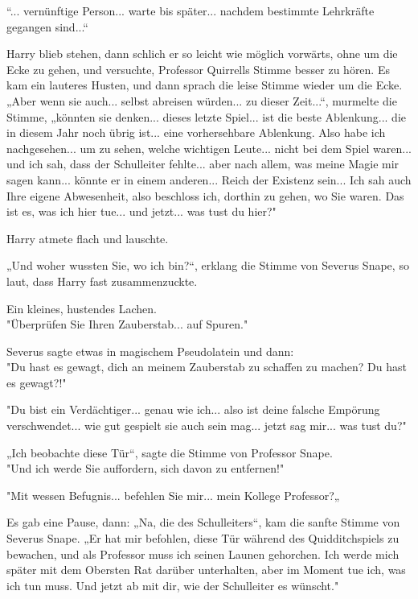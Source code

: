 {“... vernünftige Person... warte bis später... nachdem bestimmte Lehrkräfte gegangen sind...“

Harry blieb stehen, dann schlich er so leicht wie möglich vorwärts, ohne um die Ecke zu gehen, und versuchte, Professor Quirrells Stimme besser zu hören. Es kam ein lauteres Husten, und dann sprach die leise Stimme wieder um die Ecke.\\ „Aber wenn sie auch... selbst abreisen würden... zu dieser Zeit...“, murmelte die Stimme, „könnten sie denken... dieses letzte Spiel... ist die beste Ablenkung... die in diesem Jahr noch übrig ist... eine vorhersehbare Ablenkung. Also habe ich nachgesehen... um zu sehen, welche wichtigen Leute... nicht bei dem Spiel waren... und ich sah, dass der Schulleiter fehlte... aber nach allem, was meine Magie mir sagen kann... könnte er in einem anderen... Reich der Existenz sein... Ich sah auch Ihre eigene Abwesenheit, also beschloss ich, dorthin zu gehen, wo Sie waren. Das ist es, was ich hier tue... und jetzt... was tust du hier?"

Harry atmete flach und lauschte.

„Und woher wussten Sie, wo ich bin?“, erklang die Stimme von Severus Snape, so laut, dass Harry fast zusammenzuckte.

Ein kleines, hustendes Lachen.\\ "Überprüfen Sie Ihren Zauberstab... auf Spuren."

Severus sagte etwas in magischem Pseudolatein und dann:\\ "Du hast es gewagt, dich an meinem Zauberstab zu schaffen zu machen? Du hast es gewagt?!"

"Du bist ein Verdächtiger... genau wie ich... also ist deine falsche Empörung verschwendet... wie gut gespielt sie auch sein mag... jetzt sag mir... was tust du?"

„Ich beobachte diese Tür“, sagte die Stimme von Professor Snape.\\ "Und ich werde Sie auffordern, sich davon zu entfernen!"

"Mit wessen Befugnis... befehlen Sie mir... mein Kollege Professor?„

Es gab eine Pause, dann: „Na, die des Schulleiters“, kam die sanfte Stimme von Severus Snape. „Er hat mir befohlen, diese Tür während des Quidditchspiels zu bewachen, und als Professor muss ich seinen Launen gehorchen. Ich werde mich später mit dem Obersten Rat darüber unterhalten, aber im Moment tue ich, was ich tun muss. Und jetzt ab mit dir, wie der Schulleiter es wünscht."

}
